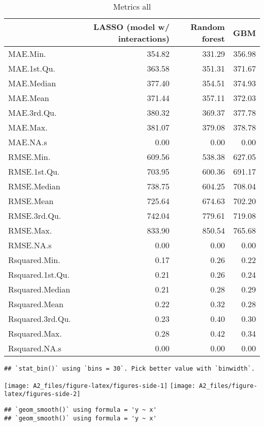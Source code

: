 \documentclass[
]{article}
\begin{document}
\begin{table}

\caption{\label{tab:unnamed-chunk-30}Metrics all}
\centering
\begin{tabular}[t]{lrrr}
\toprule
  & LASSO (model w/ interactions) & Random forest & GBM\\
\midrule
MAE.Min. & 354.82 & 331.29 & 356.98\\
MAE.1st.Qu. & 363.58 & 351.31 & 371.67\\
MAE.Median & 377.40 & 354.51 & 374.93\\
MAE.Mean & 371.44 & 357.11 & 372.03\\
MAE.3rd.Qu. & 380.32 & 369.37 & 377.78\\
MAE.Max. & 381.07 & 379.08 & 378.78\\
MAE.NA.s & 0.00 & 0.00 & 0.00\\
RMSE.Min. & 609.56 & 538.38 & 627.05\\
RMSE.1st.Qu. & 703.95 & 600.36 & 691.17\\
RMSE.Median & 738.75 & 604.25 & 708.04\\
RMSE.Mean & 725.64 & 674.63 & 702.20\\
RMSE.3rd.Qu. & 742.04 & 779.61 & 719.08\\
RMSE.Max. & 833.90 & 850.54 & 765.68\\
RMSE.NA.s & 0.00 & 0.00 & 0.00\\
Rsquared.Min. & 0.17 & 0.26 & 0.22\\
Rsquared.1st.Qu. & 0.21 & 0.26 & 0.24\\
Rsquared.Median & 0.21 & 0.28 & 0.29\\
Rsquared.Mean & 0.22 & 0.32 & 0.28\\
Rsquared.3rd.Qu. & 0.23 & 0.40 & 0.30\\
Rsquared.Max. & 0.28 & 0.42 & 0.34\\
Rsquared.NA.s & 0.00 & 0.00 & 0.00\\
\bottomrule
\end{tabular}
\end{table}

\begin{verbatim}
## `stat_bin()` using `bins = 30`. Pick better value with `binwidth`.
\end{verbatim}

\texttt{[image: A2\_files/figure-latex/figures-side-1]}
\texttt{[image: A2\_files/figure-latex/figures-side-2]}

\begin{verbatim}
## `geom_smooth()` using formula = 'y ~ x'
## `geom_smooth()` using formula = 'y ~ x'
\end{verbatim}
\end{document}
